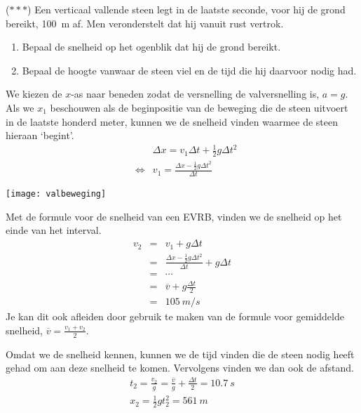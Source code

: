 \documentclass{ximera}
\begin{document}
\begin{exercise}
    ($\ast\ast\ast$) Een verticaal vallende steen legt in de laatste seconde, voor hij de grond bereikt, \SI{100}{m} af. Men veronderstelt dat hij vanuit rust vertrok.
    \begin{enumerate}
        \item Bepaal de snelheid op het ogenblik dat hij de grond bereikt.
        \item Bepaal de hoogte vanwaar de steen viel en de tijd die hij daarvoor nodig had.
    \end{enumerate}

    \begin{oplossing}
        We kiezen de $x$-as naar beneden zodat de versnelling de valversnelling is, $a=g$. Als we $x_1$ beschouwen als de beginpositie van de beweging die de steen uitvoert in de laatste honderd meter, kunnen we de snelheid vinden waarmee de steen hieraan `begint'.
        \begin{eqnarray*}
            &&\Delta x=v_1\Delta t+\frac{1}{2}g\Delta t^2\\
            &\Leftrightarrow&v_1=\frac{\Delta x-\frac{1}{2}g\Delta t^2}{\Delta t}
        \end{eqnarray*}
        \begin{image}
            \texttt{[image: valbeweging]}
        \end{image}
        Met de formule voor de snelheid van een EVRB, vinden we de snelheid op het einde van het interval.
        \begin{eqnarray*}
            v_2&=&v_1+g\Delta t\\
            &=&\frac{\Delta x-\frac{1}{2}g\Delta t^2}{\Delta t}+g\Delta t\\
            &=&\cdots\\
            &=&\overline{v}+g\frac{\Delta t}{2}\\
            &=&\SI{105}{m/s}
        \end{eqnarray*}
        Je kan dit ook afleiden door gebruik te maken van de formule voor gemiddelde snelheid, $\overline{v}=\frac{v_1+v_2}{2}$.
        
        Omdat we de snelheid kennen, kunnen we de tijd vinden die de steen nodig heeft gehad om aan deze snelheid te komen. Vervolgens vinden we dan ook de afstand.
        \begin{eqnarray*}
            t_2=\frac{v_2}{g}=\frac{\overline{v}}{g}+\frac{\Delta t}{2}=\SI{10,7}{s}\\
            x_2=\frac{1}{2}gt_2^2=\SI{561}{m}
        \end{eqnarray*}
    \end{oplossing}
\end{exercise}
\end{document}
